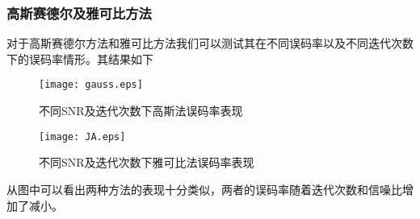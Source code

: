 \documentclass[twocolumn]{ctexart}
\begin{document}
\subsubsection{高斯赛德尔及雅可比方法}
\quad 对于高斯赛德尔方法和雅可比方法我们可以测试其在不同误码率以及不同迭代次数下的误码率情形。其结果如下
\begin{figure*}[htbp]

\begin{minipage}[t]{0.48\textwidth}
\centering
\texttt{[image: gauss.eps]}
\caption{不同SNR及迭代次数下高斯法误码率表现}
\end{minipage}
\centering
\begin{minipage}[t]{0.48\textwidth}
\centering
\texttt{[image: JA.eps]}
\caption{不同SNR及迭代次数下雅可比法误码率表现}
\end{minipage}
\end{figure*}
从图中可以看出两种方法的表现十分类似，两者的误码率随着迭代次数和信噪比增加了减小。
\end{document}
